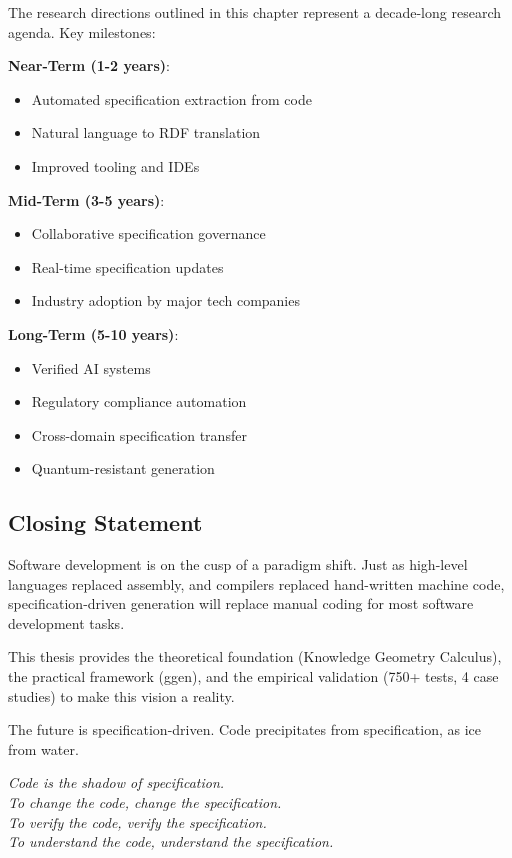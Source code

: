 The research directions outlined in this chapter represent a decade-long research agenda. Key milestones:

\textbf{Near-Term (1-2 years)}:
\begin{itemize}
    \item Automated specification extraction from code
    \item Natural language to RDF translation
    \item Improved tooling and IDEs
\end{itemize}

\textbf{Mid-Term (3-5 years)}:
\begin{itemize}
    \item Collaborative specification governance
    \item Real-time specification updates
    \item Industry adoption by major tech companies
\end{itemize}

\textbf{Long-Term (5-10 years)}:
\begin{itemize}
    \item Verified AI systems
    \item Regulatory compliance automation
    \item Cross-domain specification transfer
    \item Quantum-resistant generation
\end{itemize}

\subsection{Closing Statement}

Software development is on the cusp of a paradigm shift. Just as high-level languages replaced assembly, and compilers replaced hand-written machine code, specification-driven generation will replace manual coding for most software development tasks.

This thesis provides the theoretical foundation (Knowledge Geometry Calculus), the practical framework (ggen), and the empirical validation (750+ tests, 4 case studies) to make this vision a reality.

The future is specification-driven. Code precipitates from specification, as ice from water.

\begin{center}
    \textit{\large Code is the shadow of specification. \\
    To change the code, change the specification. \\
    To verify the code, verify the specification. \\
    To understand the code, understand the specification.}
\end{center}

